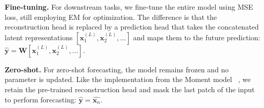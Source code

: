 
\noindent\textbf{Fine-tuning.} For downstream tasks, we fine-tune the entire model using MSE loss, still employing EM for optimization. The difference is that the reconstruction head is replaced by a prediction head that takes the concatenated latent representations $[\mathbf{x}_1^{(L)}, \mathbf{x}_2^{(L)}, \ldots ]$ and maps them to the future prediction:
$\hat{\mathbf{y}} = \mathbf{W}[\mathbf{x}_1^{(L)}, \mathbf{x}_2^{(L)}, \ldots]$.


\noindent\textbf{Zero-shot.} For zero-shot forecasting, the model remains frozen and no parameter is updated. Like the implementation from the Moment model ~\cite{goswami2024moment}, we retain the pre-trained reconstruction head and mask the last patch of the input to perform forecasting: $\hat{\mathbf{y}} = \hat{\mathbf{x}_n}$.
